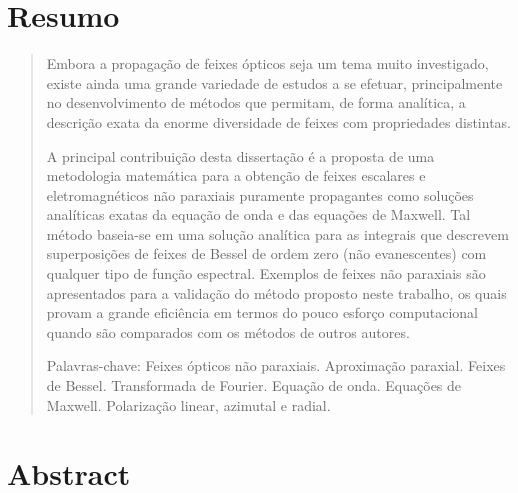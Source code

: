\chapter*{Resumo}


\begin{quotation}
\noindent Embora a propagação de feixes ópticos seja um tema muito investigado, existe ainda uma grande variedade de estudos a se efetuar, principalmente no desenvolvimento de métodos que permitam, de forma analítica, a descrição exata da enorme diversidade de feixes com propriedades distintas.

A principal contribuição desta dissertação é a proposta de uma metodologia matemática para a obtenção de feixes escalares e eletromagnéticos não paraxiais puramente propagantes como soluções analíticas exatas da equação de onda e das equações de Maxwell. Tal método baseia-se em uma solução analítica para as integrais que descrevem superposições de feixes de Bessel de ordem zero (não evanescentes) com qualquer tipo de função espectral. Exemplos de feixes não paraxiais são apresentados para a validação do método proposto neste trabalho, os quais provam a grande eficiência em termos do pouco esforço computacional quando são comparados com os métodos de outros autores.

\vspace*{0.5cm}

\noindent Palavras-chave: Feixes ópticos não paraxiais. Aproximação paraxial. Feixes de Bessel. Transformada de Fourier. Equação de onda. Equações de Maxwell. Polarização linear, azimutal e radial.

\end{quotation}


\chapter*{Abstract}


